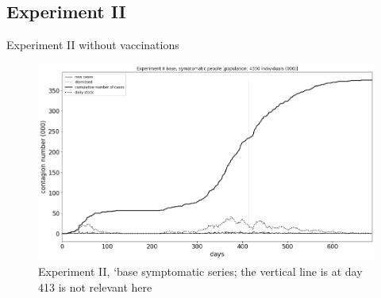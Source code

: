 \documentclass[8pt]{beamer}
\begin{document}


\subsection{Experiment II}

\begin{frame}{Experiment II without vaccinations}

\begin{figure}[H]
\center
\includegraphics[scale=0.16]{Experiment_II_base_symptomatic_series.png} 

\caption{Experiment II, `base symptomatic series; the vertical line is at day 413 is not relevant here} 
\label{Experiment_II_plainSymptomaticSeries}
\end{figure}


\end{frame}

\end{document}
